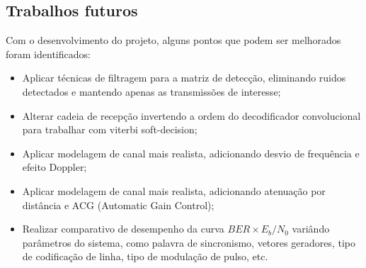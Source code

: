\subsection{Trabalhos futuros}

Com o desenvolvimento do projeto, alguns pontos que podem ser melhorados foram identificados: 
\begin{itemize}
    \item Aplicar técnicas de filtragem para a matriz de detecção, eliminando ruidos detectados e mantendo apenas as transmissões de interesse; 
    \item Alterar cadeia de recepção invertendo a ordem do decodificador convolucional para trabalhar com viterbi soft-decision;
    \item Aplicar modelagem de canal mais realista, adicionando desvio de frequência e efeito Doppler;
    \item Aplicar modelagem de canal mais realista, adicionando atenuação por distância e ACG (Automatic Gain Control);
    \item Realizar comparativo de desempenho da curva $BER \times E_b/N_0$ variândo parâmetros do sistema, como palavra de sincronismo, vetores geradores, tipo de codificação de linha, tipo de modulação de pulso, etc.
\end{itemize}